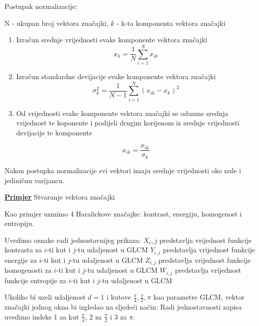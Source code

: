 \documentclass[times, utf8, zavrsni]{fer}
\begin{document}
Postupak normalizacije:
\begin{center}

N - ukupan broj vektora značajki, \(k\) - k-ta komponenta vektora značajki

\begin{enumerate}
\item Izračun srednje vrijednosti svake komponente vektora značajki
\[
x_k = \frac{1}{N}\sum_{i=1}^{N}x_{ik}
\]

\item Izračun standardne devijacije svake komponente vektora značajki
\[
\sigma_k^2 = \frac{1}{N-1}\sum_{i=1}^N\left(x_{ik}-x_k\right)^2
\]

\item Od vrijednosti svake komponente vektora značajki se oduzme srednja
vrijednost te koponente i podijeli drugim korijenom iz srednje vrijednosti
devijacije te komponente

\[
x_{ik} = \frac{x_{ik}}{\sigma_k}
\]

\end{enumerate}
\end{center}

Nakon postupka normalizacije svi vektori imaju srednje vrijednosti oko nule
i jediničnu varijancu. 

\bigbreak
\underline{\textbf{Primjer}} Stvaranje vektora značajki
\bigbreak

Kao primjer uzmimo 4 Haralickove značajke: kontrast, energiju, homogenost i entropiju. 

\bigbreak

Uvedimo oznake radi jednostavnijeg prikaza: 
\newline \(X_i,j\) predstavlja vrijednost funkcije kontrasta za \(i\)-ti
kut i \(j\)-tu udaljenost u GLCM
\newline \(Y_{i,j}\) predstavlja vrijednost funkcije energije za \(i\)-ti
kut i \(j\)-tu udaljenost u GLCM
\newline \(Z_{i,j}\) predstavlja vrijednost funkcije homogenosti za \(i\)-ti
kut i \(j\)-tu udaljenost u GLCM
\newline \(W_{i,j}\) predstavlja vrijednost funkcije entropije za \(i\)-ti
kut i \(j\)-tu udaljenost u GLCM

\bigbreak

Ukoliko bi uzeli udaljenost \(d=1\) i kutove \(\frac{\pi}{4}, \frac{\pi}{2}, \pi\)
kao parametre GLCM, vektor značajki jednog okna bi izgledao na sljedeći način:
\bigbreak
Radi jednostavnosti zapisa uvedimo indeks 1 za kut \(\frac{\pi}{4}\), 2 za
\(\frac{\pi}{2}\) i 3 za \(\pi\).
\end{document}
